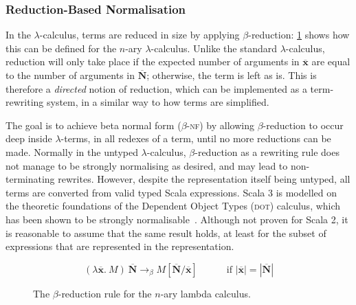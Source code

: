 \documentclass[../../main.tex]{subfiles}
\begin{document}

\subsubsection{Reduction-Based Normalisation}
In the $\lambda$-calculus, terms are reduced in size by applying $\beta$-reduction: \cref{fig:beta-reduction} shows how this can be defined for the $n$-ary $\lambda$-calculus.
Unlike the standard $\lambda$-calculus, reduction will only take place if the expected number of arguments in $\overline{\mathbf{x}}$ are equal to the number of arguments in $\overline{\mathbf{N}}$; otherwise, the term is left as is.
This is therefore a \emph{directed} notion of reduction, which can be implemented as a term-rewriting system, in a similar way to how  terms are simplified.

The goal is to achieve beta normal form ($\beta$-\textsc{nf}) by allowing $\beta$-reduction to occur deep inside $\lambda$-terms, in all redexes of a term, until no more reductions can be made.
Normally in the untyped $\lambda$-calculus, $\beta$-reduction as a rewriting rule does not manage to be strongly normalising as desired, and may lead to non-terminating rewrites.
However, despite the  representation itself being untyped, all  terms are converted from valid typed Scala expressions.
Scala 3 is modelled on the theoretic foundations of the Dependent Object Types (\textsc{dot}) calculus, which has been shown to be strongly normalisable~\cite{wang_strong_2017}.
Although not proven for Scala 2, it is reasonable to assume that the same result holds, at least for the subset of expressions that are represented in the  representation.

\begin{figure}[htbp]
\begin{equation*}
(\lambda \overline{\mathbf{x}} .\ M)\ \overline{\mathbf{N}} \rightarrow_\beta M[\overline{\mathbf{N}}/\overline{\mathbf{x}}] \hspace{3em} \text{if } | \overline{\mathbf{x}} | = | \overline{\mathbf{N}} |
\end{equation*}
\caption{The $\beta$-reduction rule for the $n$-ary lambda calculus.}
\label{fig:beta-reduction}
\end{figure}
\end{document}
